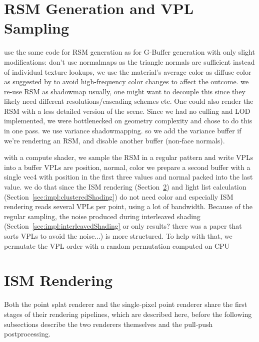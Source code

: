 \section{RSM Generation and VPL Sampling}
\label{sec:impl:rsmAndVplSampling}
\begin{outline}
\1 use the same code for RSM generation as for G-Buffer generation with only slight modifications:
\1 don't use normalmaps as the triangle normals are sufficient
\1 instead of individual texture lookups, we use the material's average color as diffuse color as suggested by \citet{hedman2016sequential} to avoid high-frequency color changes to affect the outcome.
\1 we re-use RSM as shadowmap
    \2 usually, one might want to decouple this since they likely need different resolutions/cascading schemes etc. One could also render the RSM with a less detailed version of the scene. Since we had no culling and LOD implemented, we were bottlenecked on geometry complexity and chose to do this in one pass.
    \2 we use variance shadowmapping. so we add the variance buffer if we're rendering an RSM, and disable another buffer (non-face normals).

\1 with a compute shader, we sample the RSM in a regular pattern and write VPLs into a buffer
\1 VPLs are position, normal, color
\1 we prepare a second buffer with a single vec4 with position in the first three values and normal packed into the last value.
\1 we do that since the ISM rendering (Section~\ref{sec:impl:ismRendering}) and light list calculation (Section~\ref{sec:impl:clusteredShading}) do not need color and especially ISM rendering reads several VPLs per point, using a lot of bandwidth.
\1 Because of the regular sampling, the noise produced during interleaved shading (Section~\ref{sec:impl:interleavedShading} or only results? there was a paper that sorts VPLs to avoid the noise...) is more structured. To help with that, we permutate the VPL order with a random permutation computed on CPU
\end{outline}


\section{ISM Rendering}
\label{sec:impl:ismRendering}

Both the point splat renderer and the single-pixel point renderer share the first stages of their rendering pipelines, which are described here, before the following subsections describe the two renderers themselves and the pull-push postprocessing.

